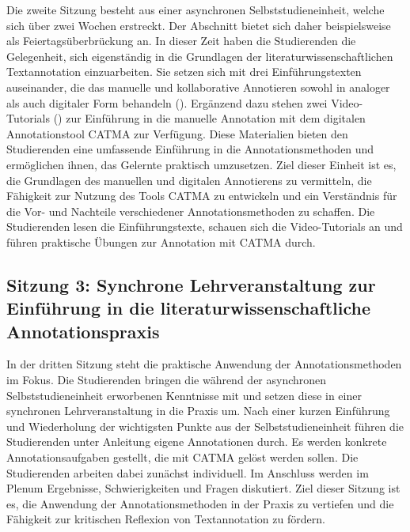 \documentclass[
          a4paper,
        ]{article}
\begin{document}
Die zweite Sitzung besteht aus einer asynchronen Selbststudieneinheit,
welche sich über zwei Wochen erstreckt. Der Abschnitt bietet sich daher
beispielsweise als Feiertagsüberbrückung an. In dieser Zeit haben die
Studierenden die Gelegenheit, sich eigenständig in die Grundlagen der
literaturwissenschaftlichen Textannotation einzuarbeiten. Sie setzen
sich mit drei Einführungstexten auseinander, die das manuelle und
kollaborative Annotieren sowohl in analoger als auch digitaler Form
behandeln
(). Ergänzend dazu stehen zwei Video-Tutorials
() zur
Einführung in die manuelle Annotation mit dem digitalen Annotationstool
CATMA zur Verfügung. Diese Materialien bieten den Studierenden eine
umfassende Einführung in die Annotationsmethoden und ermöglichen ihnen,
das Gelernte praktisch umzusetzen. Ziel dieser Einheit ist es, die
Grundlagen des manuellen und digitalen Annotierens zu vermitteln, die
Fähigkeit zur Nutzung des Tools CATMA zu entwickeln und ein Verständnis
für die Vor- und Nachteile verschiedener Annotationsmethoden zu
schaffen. Die Studierenden lesen die Einführungstexte, schauen sich die
Video-Tutorials an und führen praktische Übungen zur Annotation mit
CATMA durch.

\subsection{Sitzung 3: Synchrone Lehrveranstaltung zur Einführung in die
literaturwissenschaftliche
Annotationspraxis}\label{sitzung-3-synchrone-lehrveranstaltung-zur-einfuxfchrung-in-die-literaturwissenschaftliche-annotationspraxis}

In der dritten Sitzung steht die praktische Anwendung der
Annotationsmethoden im Fokus. Die Studierenden bringen die während der
asynchronen Selbststudieneinheit erworbenen Kenntnisse mit und setzen
diese in einer synchronen Lehrveranstaltung in die Praxis um. Nach einer
kurzen Einführung und Wiederholung der wichtigsten Punkte aus der
Selbststudieneinheit führen die Studierenden unter Anleitung eigene
Annotationen durch. Es werden konkrete Annotationsaufgaben gestellt, die
mit CATMA gelöst werden sollen. Die Studierenden arbeiten dabei zunächst
individuell. Im Anschluss werden im Plenum Ergebnisse, Schwierigkeiten
und Fragen diskutiert. Ziel dieser Sitzung ist es, die Anwendung der
Annotationsmethoden in der Praxis zu vertiefen und die Fähigkeit zur
kritischen Reflexion von Textannotation zu fördern.
\end{document}

